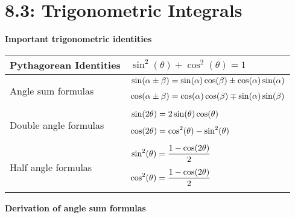 \documentclass[../mathNotesPreamble]{subfiles}
\begin{document}
  \section{8.3: Trigonometric Integrals}
  \textbf{Important trigonometric identities}
  \begin{center}
    \begin{tabularx}{0.9\linewidth}{@{}
      >{\hsize=0.9\hsize}X
      >{\hsize=1.1\hsize}X
      @{}}\toprule
      Pythagorean Identities&
      \vspace*{0.25\baselineskip}
      $\sin^2(\theta)+\cos^2(\theta)=1$\\[4\baselineskip]\midrule
      Angle sum formulas& 
      \vspace*{0.25\baselineskip}
      $\begin{aligned}
        \sin(\alpha\pm\beta)&=\sin(\alpha)\cos(\beta)\pm\cos(\alpha)\sin(\alpha)\\[0.25\baselineskip]
        \cos(\alpha\pm\beta)&=\cos(\alpha)\cos(\beta)\mp\sin(\alpha)\sin(\beta)\\[0.25\baselineskip]
      \end{aligned}$\\\midrule
      Double angle formulas&
      \vspace*{0.25\baselineskip}
      $\begin{aligned}
        \sin(2\theta)&=2\sin(\theta)\cos(\theta)\\[0.25\baselineskip]
        \cos(2\theta)&=\cos^2(\theta)-\sin^2(\theta)\\[0.25\baselineskip]
      \end{aligned}$\\\midrule
      Half angle formulas&
      \vspace*{0.25\baselineskip}
      $\begin{aligned}
        \sin^2(\theta)&=\dfrac{1-\cos(2\theta)}{2}\\[0.25\baselineskip]
        \cos^2(\theta)&=\dfrac{1-\cos(2\theta)}{2}\\[0.25\baselineskip]
      \end{aligned}$\\\bottomrule
    \end{tabularx}
  \end{center}
  \pagebreak

  \textbf{Derivation of angle sum formulas}
\end{document}
